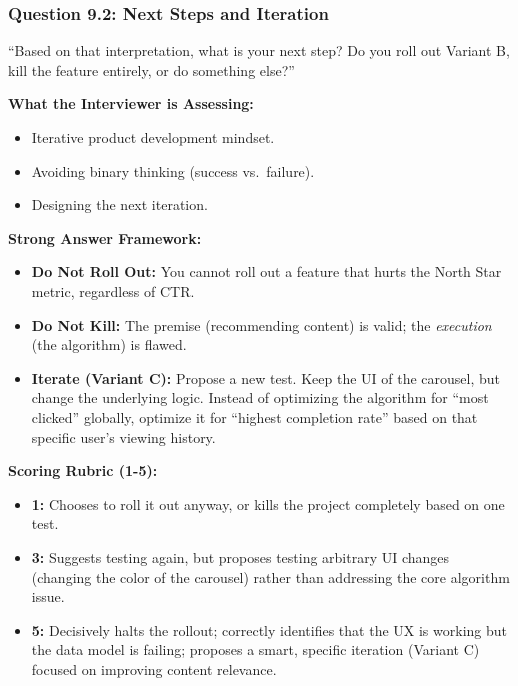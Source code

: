 \documentclass[
  11pt,
  openany,
  oneside]{book}
\providecommand{\tightlist}{%
  \setlength{\itemsep}{0pt}\setlength{\parskip}{0pt}}
\begin{document}
\subsubsection{Question 9.2: Next Steps and
Iteration}\label{question-9.2-next-steps-and-iteration}

``Based on that interpretation, what is your next step? Do you roll out
Variant B, kill the feature entirely, or do something else?''

\textbf{What the Interviewer is Assessing:}

\begin{itemize}
\tightlist
\item
  Iterative product development mindset.
\item
  Avoiding binary thinking (success vs.~failure).
\item
  Designing the next iteration.
\end{itemize}

\textbf{Strong Answer Framework:}

\begin{itemize}
\tightlist
\item
  \textbf{Do Not Roll Out:} You cannot roll out a feature that hurts the
  North Star metric, regardless of CTR.
\item
  \textbf{Do Not Kill:} The premise (recommending content) is valid; the
  \emph{execution} (the algorithm) is flawed.
\item
  \textbf{Iterate (Variant C):} Propose a new test. Keep the UI of the
  carousel, but change the underlying logic. Instead of optimizing the
  algorithm for ``most clicked'' globally, optimize it for ``highest
  completion rate'' based on that specific user's viewing history.
\end{itemize}

\textbf{Scoring Rubric (1-5):}

\begin{itemize}
\tightlist
\item
  \textbf{1:} Chooses to roll it out anyway, or kills the project
  completely based on one test.
\item
  \textbf{3:} Suggests testing again, but proposes testing arbitrary UI
  changes (changing the color of the carousel) rather than addressing
  the core algorithm issue.
\item
  \textbf{5:} Decisively halts the rollout; correctly identifies that
  the UX is working but the data model is failing; proposes a smart,
  specific iteration (Variant C) focused on improving content relevance.
\end{itemize}
\end{document}
